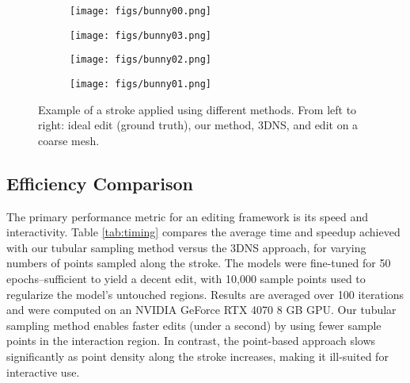 \begin{figure}[h]
    \centering
    \begin{subfigure}{0.24\columnwidth} %
        \texttt{[image: figs/bunny00.png]}
    \end{subfigure}
    \vline
    \begin{subfigure}{0.24\columnwidth}
        \texttt{[image: figs/bunny03.png]}
    \end{subfigure}
    \begin{subfigure}{0.24\columnwidth}
        \texttt{[image: figs/bunny02.png]}
    \end{subfigure}
    \begin{subfigure}{0.24\columnwidth}
        \texttt{[image: figs/bunny01.png]}
    \end{subfigure}
    
    \caption{Example of a stroke applied using different methods. From left to right: ideal edit (ground truth), our method, 3DNS, and edit on a coarse mesh.}
    \label{fig:comparison}
    \vspace{-0.4cm}
\end{figure}

\subsection{Efficiency Comparison}
The primary performance metric for an editing framework is its speed and interactivity. Table \ref{tab:timing} compares the average time and speedup achieved with our tubular sampling method versus the 3DNS approach, for varying numbers of points sampled along the stroke. The models were fine-tuned for 50 epochs--sufficient to yield a decent edit, with 10,000 sample points used to regularize the model's untouched regions. Results are averaged over 100 iterations and were computed on an NVIDIA GeForce RTX 4070 8 GB GPU. Our tubular sampling method enables faster edits (under a second) by using fewer sample points in the interaction region. In contrast, the point-based approach slows significantly as point density along the stroke increases, making it ill-suited for interactive use.
